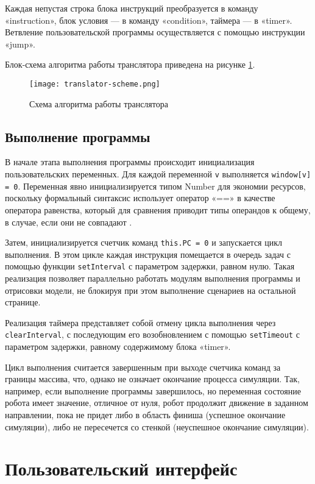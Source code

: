 Каждая непустая строка блока инструкций преобразуется в команду «instruction», блок условия — в команду «condition», таймера — в «timer». Ветвление пользовательской программы осуществляется с помощью инструкции «jump».

Блок-схема алгоритма работы транслятора приведена на рисунке \ref{fig:translator-scheme}.

\begin{figure}[htbp]
	\centering
	\texttt{[image: translator-scheme.png]}
	\caption{Схема алгоритма работы транслятора}%
	\label{fig:translator-scheme}
\end{figure}

\subsection{Выполнение программы}

В начале этапа выполнения программы происходит инициализация пользовательских переменных. Для каждой переменной \lstinline|v| выполняется \lstinline|window[v] = 0|. Переменная явно инициализируется типом Number для экономии ресурсов, поскольку формальный синтаксис использует оператор «==» в качестве оператора равенства, который для сравнения приводит типы операндов к общему, в случае, если они не совпадают \cite{mdn-sameness}.

Затем, инициализируется счетчик команд \lstinline|this.PC = 0| и запускается цикл выполнения. В этом цикле каждая инструкция помещается в очередь задач с помощью  функции \lstinline|setInterval| с параметром задержки, равном нулю. Такая реализация позволяет параллельно работать модулям выполнения программы и отрисовки модели, не блокируя при этом выполнение сценариев на остальной странице.

Реализация таймера представляет собой отмену цикла выполнения через \lstinline|clearInterval|, с последующим его возобновлением с помощью \lstinline|setTimeout| с параметром задержки, равному содержимому блока «timer».

Цикл выполнения считается завершенным при выходе счетчика команд за границы массива, что, однако не означает окончание процесса симуляции. Так, например, если выполнение программы завершилось, но переменная состояние робота имеет значение, отличное от нуля, робот продолжит движение в заданном направлении, пока не придет либо в область финиша (успешное окончание симуляции), либо не пересечется со стенкой (неуспешное окончание симуляции).

 
\section{Пользовательский интерфейс}

